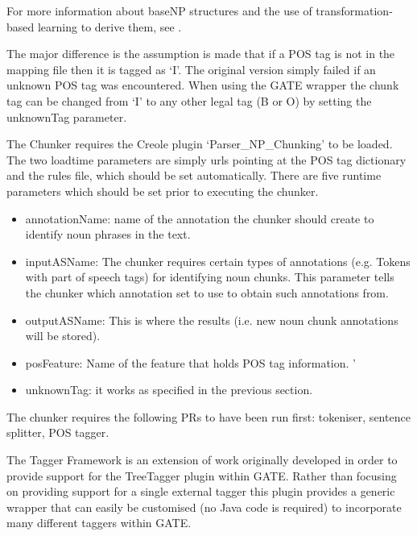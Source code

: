 For more information about baseNP structures and the use of
transformation-based learning to derive them, see \cite{Ramshaw95}.


The major difference is the assumption is made that if a POS tag
is not in the mapping file then it is tagged as `I'. The original
version simply failed if an unknown POS tag was encountered.
When using the GATE wrapper the chunk tag can be changed from `I'
to any other legal tag (B or O) by setting the unknownTag parameter.


The Chunker requires the Creole plugin `Parser\_NP\_Chunking' to be loaded.
The two loadtime parameters are simply urls pointing at the POS tag dictionary
and the rules file, which should be set automatically.  There are five runtime
parameters which should be set prior to executing the chunker.

\begin{itemize}
\item annotationName: name of the annotation the chunker should create to
          identify noun phrases in the text.

\item inputASName: The chunker requires certain types of annotations (e.g.
          Tokens with part of speech tags) for identifying noun chunks.  This 
          parameter tells the chunker which annotation set to use to obtain such
          annotations from.

\item outputASName: This is where the results (i.e. new noun chunk 
         annotations will be stored).

\item posFeature: Name of the feature that holds POS tag information.
'
\item unknownTag: it works as specified in the previous section.
\end{itemize}


The chunker requires the following PRs to have been run first: tokeniser,
sentence splitter, POS tagger.


The Tagger Framework is an extension of work originally developed in order to
provide support for the TreeTagger plugin within GATE. Rather than focusing on providing support for a single external tagger
this plugin provides a generic wrapper that can easily be customised (no Java code is required) to
incorporate many different taggers within GATE.

